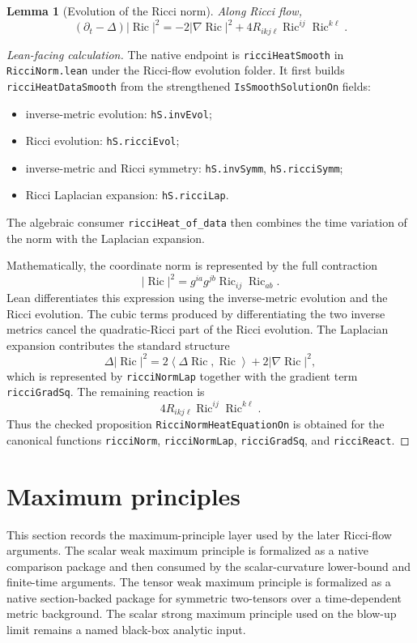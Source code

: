 \documentclass[11pt]{article}
\theoremstyle{plain}
\newtheorem{lemma}[theorem]{Lemma}
\theoremstyle{definition}
\theoremstyle{remark}
\newcommand{\Ric}{\operatorname{Ric}}
\newcommand{\ip}[2]{\left\langle #1,#2\right\rangle}
\newcommand{\norm}[1]{\left|#1\right|}
\newcommand{\leanref}[1]{\nolinkurl{#1}}
\newcommand{\leanfile}[1]{\nolinkurl{#1}}
\newcommand{\rffile}[1]{\leanfile{#1}}
\begin{document}
\begin{lemma}[Evolution of the Ricci norm]
\label{lem:evol-ricci-norm}
Along Ricci flow,
\[
(\partial_t-\Delta)\norm{\Ric}^2
=
-2\norm{\nabla\Ric}^2
+4R_{ikj\ell}\Ric^{ij}\Ric^{k\ell}.
\]
\end{lemma}

\begin{proof}[Lean-facing calculation]
The native endpoint is \leanref{ricciHeatSmooth} in \rffile{RicciNorm.lean}
under the Ricci-flow evolution folder.  It first builds
\leanref{ricciHeatDataSmooth} from the strengthened
\leanref{IsSmoothSolutionOn} fields:
\begin{itemize}[leftmargin=2em]
  \item inverse-metric evolution: \leanref{hS.invEvol};
  \item Ricci evolution: \leanref{hS.ricciEvol};
  \item inverse-metric and Ricci symmetry: \leanref{hS.invSymm},
    \leanref{hS.ricciSymm};
  \item Ricci Laplacian expansion: \leanref{hS.ricciLap}.
\end{itemize}
The algebraic consumer \leanref{ricciHeat_of_data} then combines the time
variation of the norm with the Laplacian expansion.

Mathematically, the coordinate norm is represented by the full contraction
\[
  \norm{\Ric}^2=g^{ia}g^{jb}\Ric_{ij}\Ric_{ab}.
\]
Lean differentiates this expression using the inverse-metric evolution and the
Ricci evolution.  The cubic terms produced by differentiating the two inverse
metrics cancel the quadratic-Ricci part of the Ricci evolution.  The Laplacian
expansion contributes the standard structure
\[
  \Delta\norm{\Ric}^2
  =2\ip{\Delta\Ric}{\Ric}+2\norm{\nabla\Ric}^2,
\]
which is represented by \leanref{ricciNormLap} together with the gradient term
\leanref{ricciGradSq}.  The remaining reaction is
\[
  4R_{ikj\ell}\Ric^{ij}\Ric^{k\ell}.
\]
Thus the checked proposition \leanref{RicciNormHeatEquationOn} is obtained for
the canonical functions \leanref{ricciNorm}, \leanref{ricciNormLap},
\leanref{ricciGradSq}, and \leanref{ricciReact}.
\end{proof}


\section{Maximum principles}

This section records the maximum-principle layer used by the later Ricci-flow
arguments.  The scalar weak maximum principle is formalized as a native
comparison package and then consumed by the scalar-curvature lower-bound and
finite-time arguments.  The tensor weak maximum principle is formalized as a
native section-backed package for symmetric two-tensors over a time-dependent
metric background.  The scalar strong maximum principle used on the blow-up
limit remains a named black-box analytic input.
\end{document}
